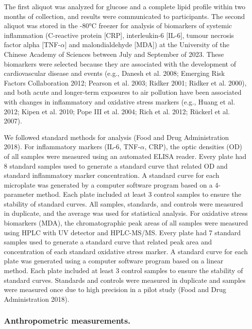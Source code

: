 \documentclass[
  letterpaper,
  DIV=11,
  numbers=noendperiod]{scrartcl}
\begin{document}
The first aliquot was analyzed for glucose and a complete lipid profile
within two months of collection, and results were communicated to
participants. The second aliquot was stored in the -80°C freezer for
analysis of biomarkers of systemic inflammation (C-reactive protein
{[}CRP{]}, interleukin-6 {[}IL-6{]}, tumour necrosis factor alpha
{[}TNF-\(\alpha\){]} and malondialdehyde {[}MDA{]}) at the University of
the Chinese Academy of Sciences between July and September of 2023.
These biomarkers were selected because they are associated with the
development of cardiovascular disease and events (e.g., Danesh et al.
2008; Emerging Risk Factors Collaboration 2012; Pearson et al. 2003;
Ridker 2001; Ridker et al. 2000), and both acute and longer-term
exposures to air pollution have been associated with changes in
inflammatory and oxidative stress markers (e.g., Huang et al. 2012;
Kipen et al. 2010; Pope III et al. 2004; Rich et al. 2012; Rückerl et
al. 2007).

We followed standard methods for analysis (Food and Drug Administration
2018). For inflammatory markers (IL-6, TNF-\(\alpha\), CRP), the optic
densities (OD) of all samples were measured using an automated ELISA
reader. Every plate had 8 standard samples used to generate a standard
curve that related OD and standard inflammatory marker concentration. A
standard curve for each microplate was generated by a computer software
program based on a 4-parameter method. Each plate included at least 3
control samples to ensure the stability of standard curves. All samples,
standards, and controls were measured in duplicate, and the average was
used for statistical analysis. For oxidative stress biomarkers (MDA),
the chromatographic peak areas of all samples were measured using HPLC
with UV detector and HPLC-MS/MS. Every plate had 7 standard samples used
to generate a standard curve that related peak area and concentration of
each standard oxidative stress marker. A standard curve for each plate
was generated using a computer software program based on a linear
method. Each plate included at least 3 control samples to ensure the
stability of standard curves. Standards and controls were measured in
duplicate and samples were measured once due to high precision in a
pilot study (Food and Drug Administration 2018).

\subsubsection{Anthropometric
measurements.}\label{anthropometric-measurements.}
\end{document}
